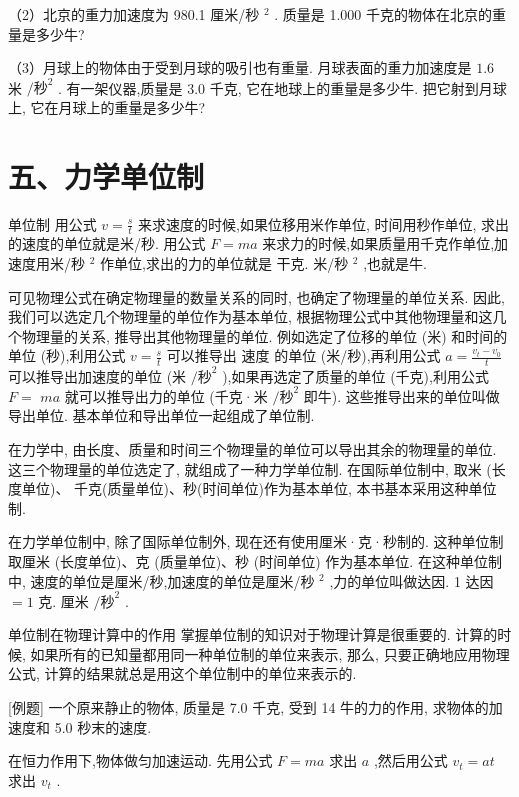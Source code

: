 \documentclass[10pt]{article}
\begin{document}
（2）北京的重力加速度为 980.1 厘米/秒 \({}^{2}\) . 质量是 1.000 千克的物体在北京的重量是多少牛?

（3）月球上的物体由于受到月球的吸引也有重量. 月球表面的重力加速度是 \({1.6}\) 米 \(/{秒}^{2}\) . 有一架仪器,质量是 3.0 千克, 它在地球上的重量是多少牛. 把它射到月球上, 它在月球上的重量是多少牛?

\section*{五、力学单位制}

单位制 用公式 \(v = \frac{s}{t}\) 来求速度的时候,如果位移用米作单位, 时间用秒作单位, 求出的速度的单位就是米/秒. 用公式 \(F = {ma}\) 来求力的时候,如果质量用千克作单位,加速度用米/秒 \({}^{2}\) 作单位,求出的力的单位就是 干克. 米/秒 \({}^{2}\) ,也就是牛.

可见物理公式在确定物理量的数量关系的同时, 也确定了物理量的单位关系. 因此, 我们可以选定几个物理量的单位作为基本单位, 根据物理公式中其他物理量和这几个物理量的关系, 推导出其他物理量的单位. 例如选定了位移的单位 (米) 和时间的单位 (秒),利用公式 \(v = \frac{s}{t}\) 可以推导出 速度 的单位 (米/秒),再利用公式 \(a = \frac{{v}_{t} - {v}_{0}}{t}\) 可以推导出加速度的单位 (米 \(/{\text{秒}}^{2}\) ),如果再选定了质量的单位 (千克),利用公式 \(F =\) \({ma}\) 就可以推导出力的单位 (千克·米 \(/{\text{秒}}^{2}\) 即牛). 这些推导出来的单位叫做导出单位. 基本单位和导出单位一起组成了单位制.

在力学中, 由长度、质量和时间三个物理量的单位可以导出其余的物理量的单位. 这三个物理量的单位选定了, 就组成了一种力学单位制. 在国际单位制中, 取米 (长度单位)、 千克(质量单位)、秒(时间单位)作为基本单位, 本书基本采用这种单位制.

在力学单位制中, 除了国际单位制外, 现在还有使用厘米·克·秒制的. 这种单位制取厘米 (长度单位)、克 (质量单位)、秒 (时间单位) 作为基本单位. 在这种单位制中, 速度的单位是厘米/秒,加速度的单位是厘米/秒 \({}^{2}\) ,力的单位叫做达因. 1 达因 \(= 1\) 克. 厘米 \(/{\text{秒}}^{2}\) .

单位制在物理计算中的作用 掌握单位制的知识对于物理计算是很重要的. 计算的时候, 如果所有的已知量都用同一种单位制的单位来表示, 那么, 只要正确地应用物理公式, 计算的结果就总是用这个单位制中的单位来表示的.

[例题] 一个原来静止的物体, 质量是 7.0 千克, 受到 14 牛的力的作用, 求物体的加速度和 5.0 秒末的速度.

在恒力作用下,物体做匀加速运动. 先用公式 \(F = {ma}\) 求出 \(a\) ,然后用公式 \({v}_{t} = {at}\) 求出 \({v}_{t}\) .
\end{document}
